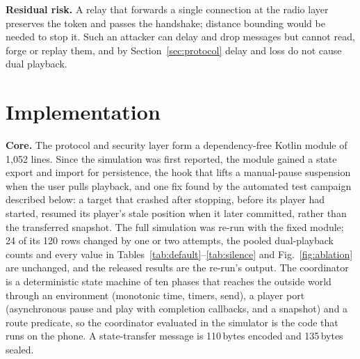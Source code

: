 \documentclass[conference]{IEEEtran}
\begin{document}
\textbf{Residual risk.} A relay that forwards a single connection at the radio layer preserves the token and passes the handshake; distance bounding would be needed to stop it. Such an attacker can delay and drop messages but cannot read, forge or replay them, and by Section~\ref{sec:protocol} delay and loss do not cause dual playback.

\section{Implementation}\label{sec:impl}

\textbf{Core.} The protocol and security layer form a dependency-free Kotlin module of 1{,}052 lines. Since the simulation was first reported, the module gained a state export and import for persistence, the hook that lifts a manual-pause suspension when the user pulls playback, and one fix found by the automated test campaign described below: a target that crashed after stopping, before its player had started, resumed its player's stale position when it later committed, rather than the transferred snapshot. The full simulation was re-run with the fixed module; 24 of its 120 rows changed by one or two attempts, the pooled dual-playback counts and every value in Tables~\ref{tab:default}--\ref{tab:silence} and Fig.~\ref{fig:ablation} are unchanged, and the released results are the re-run's output. The coordinator is a deterministic state machine of ten phases that reaches the outside world through an environment (monotonic time, timers, send), a player port (asynchronous pause and play with completion callbacks, and a snapshot) and a route predicate, so the coordinator evaluated in the simulator is the code that runs on the phone. A state-transfer message is 110\,bytes encoded and 135\,bytes sealed.
\end{document}

